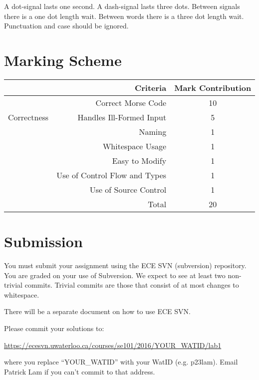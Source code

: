 \documentclass{article}
\begin{document}
A dot-signal lasts one second.  A dash-signal lasts three dots.  Between signals there is a one dot length wait.  Between words there is a three dot length wait.  Punctuation and case should be ignored.


\section*{Marking Scheme}
\begin{center}
\begin{tabular}[c]{cr|c}
&\textbf{Criteria} & \textbf{Mark Contribution} \\ \hline
\multirow{3}{*}{Correctness} 
	& Correct Morse Code & 10 \\
	& Handles Ill-Formed Input & 5 \\

\multirow{4}{*}{Style} 
	& Naming & 1 \\
    	& Whitespace Usage & 1 \\
	& Easy to Modify & 1 \\
	& Use of Control Flow and Types & 1 \\
	& Use of Source Control & 1 \\ \hhline{==|=}
	
& Total & 20 \\ 
\end{tabular}
\end{center}

\section*{Submission}
You must submit your assignment using the ECE SVN (subversion) repository.  You are graded on your use of Subversion.  We expect to see at least two non-trivial commits. Trivial commits are those that consist of at most changes to whitespace.

There will be a separate document on how to use ECE SVN.

Please commit your solutions to:

\begin{center}
\url{https://ecesvn.uwaterloo.ca/courses/se101/2016/YOUR\_WATID/lab1}
\end{center}

where you replace ``YOUR\_WATID'' with your WatID (e.g. p23lam). Email Patrick Lam if you can't commit to that address.
\end{document}
